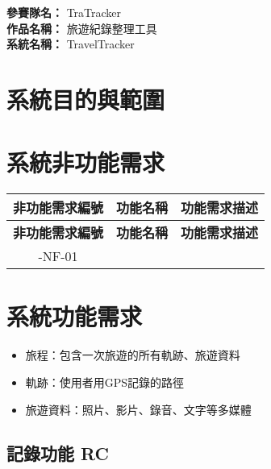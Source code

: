 \documentclass[12pt]{article}
\begin{document}
\date{}
\usetikzlibrary{automata, positioning, arrows}
{}
\renewcommand{\arraystretch}{1.45}

\noindent
\textbf{參賽隊名：} TraTracker \\
\textbf{作品名稱：} 旅遊紀錄整理工具 \\
\textbf{系統名稱：} TravelTracker

\section{系統目的與範圍}

\section{系統非功能需求}

\begin{longtable}{|c|p{5.2cm}|p{7.5cm}|}
  \hline
  \textbf{非功能需求編號} & \textbf{功能名稱} & \textbf{功能需求描述} \\
  \hline
  \endfirsthead
  \hline
  \textbf{非功能需求編號} & \textbf{功能名稱} & \textbf{功能需求描述} \\
  \hline
  \endhead
  []-NF-01 & {} & {} \\
  \hline
\end{longtable}

\section{系統功能需求}

\begin{itemize}
  \item 旅程：包含一次旅遊的所有軌跡、旅遊資料
  \item 軌跡：使用者用GPS記錄的路徑
  \item 旅遊資料：照片、影片、錄音、文字等多媒體
\end{itemize}

\subsection{記錄功能 RC}
\end{document}
